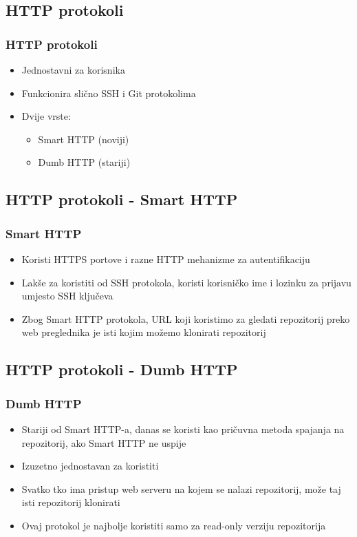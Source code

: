 \subsection{HTTP protokoli}

\begin{frame}
\frametitle{HTTP protokoli}
\begin{itemize}
	\item Jednostavni za korisnika
	\item Funkcionira slično SSH i Git protokolima
	\item Dvije vrste:
	\begin{itemize}
		\item Smart HTTP (noviji)
		\item Dumb HTTP (stariji)
	\end{itemize}
\end{itemize}
\end{frame}


\subsection{HTTP protokoli - Smart HTTP}
\begin{frame}
\frametitle{Smart HTTP}
\begin{itemize}
	\item Koristi HTTPS portove i razne HTTP mehanizme za autentifikaciju
	\item Lakše za koristiti od SSH protokola, koristi korisničko ime i lozinku za prijavu umjesto SSH ključeva
	\item Zbog Smart HTTP protokola, URL koji koristimo za gledati repozitorij preko web preglednika je isti kojim možemo klonirati repozitorij
\end{itemize}
\end{frame}


\subsection{HTTP protokoli - Dumb HTTP}
\begin{frame}
\frametitle{Dumb HTTP}
\begin{itemize}
	\item Stariji od Smart HTTP-a, danas se koristi kao pričuvna metoda spajanja na repozitorij, ako Smart HTTP ne uspije
	\item Izuzetno jednostavan za koristiti
	\item Svatko tko ima pristup web serveru na kojem se nalazi repozitorij, može taj isti repozitorij klonirati
	\item Ovaj protokol je najbolje koristiti samo za read-only verziju repozitorija
\end{itemize}
\end{frame}